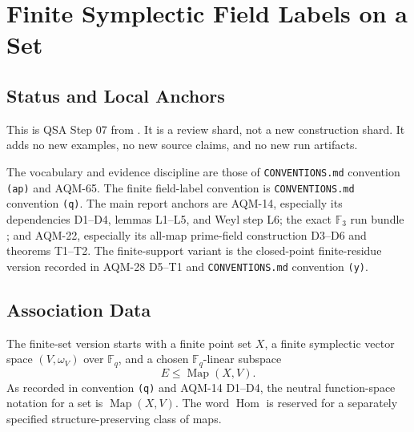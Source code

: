 
\section{Finite Symplectic Field Labels on a Set}
\label{sec:qsa-symplectic-field-labels-set}

\subsection{Status and Local Anchors}

This is QSA Step 07 from
.  It is a review shard, not a
new construction shard.  It adds no new examples, no new source claims, and no
new run artifacts.

The vocabulary and evidence discipline are those of
\texttt{CONVENTIONS.md} convention \texttt{(ap)} and AQM-65.  The finite
field-label convention is \texttt{CONVENTIONS.md} convention \texttt{(q)}.
The main report anchors are AQM-14, especially its dependencies D1--D4,
lemmas L1--L5, and Weyl step L6; the exact
\(\mathbb F_3\) run bundle
; and AQM-22, especially
its all-map prime-field construction D3--D6 and theorems T1--T2.  The
finite-support variant is the closed-point finite-residue version recorded in
AQM-28 D5--T1 and \texttt{CONVENTIONS.md} convention \texttt{(y)}.

\subsection{Association Data}

The finite-set version starts with a finite point set \(X\), a finite
symplectic vector space \((V,\omega_V)\) over \(\mathbb F_q\), and a chosen
\(\mathbb F_q\)-linear subspace
\[
  E\leq \operatorname{Map}(X,V).
\]
As recorded in convention \texttt{(q)} and AQM-14 D1--D4, the neutral
function-space notation for a set is \(\operatorname{Map}(X,V)\).  The word
\(\operatorname{Hom}\) is reserved for a separately specified
structure-preserving class of maps.


